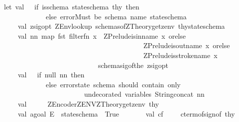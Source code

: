 \begin{isabellebody}
\ \ \ let\ val\ {\isacharunderscore}\ {\isacharequal}\ if\ is{\isacharunderscore}schema\ stateschema\ thy\ then\ {\isacharparenleft}{\isacharparenright}\isanewline
\ \ \ \ \ \ \ \ \ \ \ \ \ \ \ else\ error{\isacharparenleft}{\isachardoublequote}Must\ be\ schema\ name{\isacharcolon}\ {\isachardoublequote}{\isacharcircum}stateschema{\isacharparenright}\isanewline
\ \ \ \ \ \ \ val\ zsig{\isacharunderscore}opt{\isacharequal}\ ZEnv{\isachardot}lookup\ {\isacharparenleft}schemas{\isacharunderscore}of{\isacharparenleft}ZTheory{\isachardot}get{\isacharunderscore}zenv\ thy{\isacharparenright}{\isacharcomma}stateschema{\isacharparenright}\isanewline
\ \ \ \ \ \ \ val\ nn{\isacharequal}\ map\ fst\ {\isacharparenleft}filter{\isacharparenleft}fn\ {\isacharparenleft}x{\isacharcomma}{\isacharunderscore}{\isacharparenright}\ {\isacharequal}{\isachargreater}\ ZPrelude{\isachardot}is{\isacharunderscore}in{\isacharunderscore}name\ x\ orelse\isanewline
\ \ \ \ \ \ \ \ \ \ \ \ \ \ \ \ \ \ \ \ \ \ \ \ \ \ \ \ \ \ \ \ \ \ \ \ \ \ \ \ \ \ \ ZPrelude{\isachardot}is{\isacharunderscore}out{\isacharunderscore}name\ x\ orelse\isanewline
\ \ \ \ \ \ \ \ \ \ \ \ \ \ \ \ \ \ \ \ \ \ \ \ \ \ \ \ \ \ \ \ \ \ \ \ \ \ \ \ \ \ \ ZPrelude{\isachardot}is{\isacharunderscore}stroke{\isacharunderscore}name\ x{\isacharparenright}\isanewline
\ \ \ \ \ \ \ \ \ \ \ \ \ \ \ \ \ \ \ \ \ \ \ \ \ \ \ \ \ \ {\isacharparenleft}schemasig{\isacharunderscore}of{\isacharparenleft}the\ zsig{\isacharunderscore}opt{\isacharparenright}{\isacharparenright}{\isacharparenright}\isanewline
\ \ \ \ \ \ \ val\ {\isacharunderscore}\ {\isacharequal}\ if\ null\ nn\ then\ {\isacharparenleft}{\isacharparenright}\isanewline
\ \ \ \ \ \ \ \ \ \ \ \ \ \ \ else\ error{\isacharparenleft}{\isachardoublequote}state\ schema\ should\ contain\ only\ {\isacharbackslash}\isanewline
\ \ \ \ \ \ \ \ \ \ \ \ \ \ \ \ \ \ \ \ \ \ \ \ \ \ {\isacharbackslash}undecorated\ variables{\isacharcolon}\ {\isachardoublequote}{\isacharcircum}{\isacharparenleft}String{\isachardot}concat\ nn{\isacharparenright}{\isacharparenright}\isanewline
\ \ \ \ \ \ \ val\ {\isacharunderscore}\ \ \ \ {\isacharequal}\ {\isacharparenleft}ZEncoder{\isachardot}ZENV{\isacharcolon}{\isacharequal}ZTheory{\isachardot}get{\isacharunderscore}zenv\ thy{\isacharparenright}\isanewline
\isanewline
\ \ \ \ \ \ \ val\ agoal{\isacharequal}\ {\isachardoublequote}{\isacharpercent}E\ {\isachardoublequote}{\isacharcircum}\ stateschema{\isacharcircum}{\isachardoublequote}\ {\isacharat}\ True{\isachardoublequote}{\isacharsemicolon}\isanewline
\ \ \ \ \ \ \ val\ cf\ \ \ {\isacharequal}\ \ cterm{\isacharunderscore}of{\isacharparenleft}sign{\isacharunderscore}of\ thy{\isacharparenright}\isanewline

\end{isabellebody}

